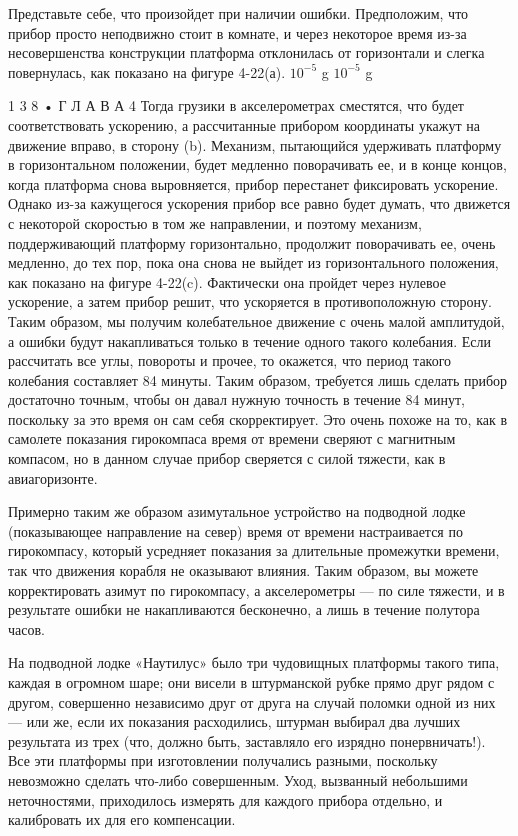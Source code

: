 \documentclass[10pt,oneside]{article}
\begin{document}
Представьте себе, что произойдет при наличии ошибки. Предположим, что прибор просто неподвижно стоит в комнате, и через некоторое время из-за несовершенства конструкции платформа отклонилась от горизонтали и слегка повернулась, как показано на фигуре 4-22(а). \(10^{-5}\) g \(10^{-5}\) g\par

1 3 8 • Г Л А В А  4 Тогда грузики в акселерометрах сместятся, что будет соответствовать ускорению, а рассчитанные прибором координаты укажут на движение вправо, в сторону (b). Механизм, пытающийся удерживать платформу в горизонтальном положении, будет медленно поворачивать ее, и в конце концов, когда платформа снова выровняется, прибор перестанет фиксировать ускорение. Однако из-за кажущегося ускорения прибор все равно будет думать, что движется с некоторой скоростью в том же направлении, и поэтому механизм, поддерживающий платформу горизонтально, продолжит поворачивать ее, очень медленно, до тех пор, пока она снова не выйдет из горизонтального положения, как показано на фигуре 4-22(c). Фактически она пройдет через нулевое ускорение, а затем прибор решит, что ускоряется в противоположную сторону. Таким образом, мы получим колебательное движение с очень малой амплитудой, а ошибки будут накапливаться только в течение одного такого колебания. Если рассчитать все углы, повороты и прочее, то окажется, что период такого колебания составляет 84 минуты. Таким образом, требуется лишь сделать прибор достаточно точным, чтобы он давал нужную точность в течение 84 минут, поскольку за это время он сам себя скорректирует. Это очень похоже на то, как в самолете показания гирокомпаса время от времени сверяют с магнитным компасом, но в данном случае прибор сверяется с силой тяжести, как в авиагоризонте.\par

Примерно таким же образом азимутальное устройство на подводной лодке (показывающее направление на север) время от времени настраивается по гирокомпасу, который усредняет показания за длительные промежутки времени, так что движения корабля не оказывают влияния. Таким образом, вы можете корректировать азимут по гирокомпасу, а акселерометры --- по силе тяжести, и в результате ошибки не накапливаются бесконечно, а лишь в течение полутора часов.\par

На подводной лодке «Наутилус» было три чудовищных платформы такого типа, каждая в огромном шаре; они висели в штурманской рубке прямо друг рядом с другом, совершенно независимо друг от друга на случай поломки одной из них --- или же, если их показания расходились, штурман выбирал два лучших результата из трех (что, должно быть, заставляло его изрядно понервничать!). Все эти платформы при изготовлении получались разными, поскольку невозможно сделать что-либо совершенным. Уход, вызванный небольшими неточностями, приходилось измерять для каждого прибора отдельно, и калибровать их для его компенсации.\par
\end{document}

